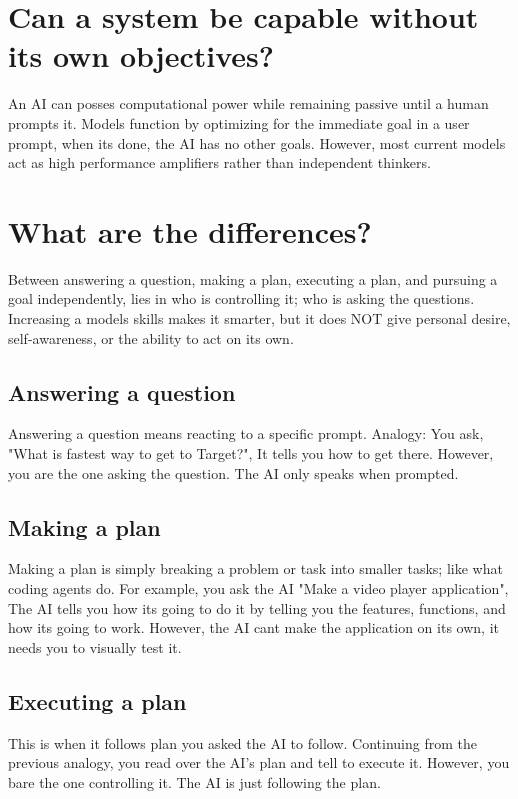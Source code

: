 \documentclass{report}
\begin{document}
	\section{Can a system be capable without its own objectives?}
	An AI can posses computational power while remaining passive until a human prompts it. Models function by optimizing for the immediate goal in a user prompt, when its done, the AI has no other goals. However, most current models act as high performance amplifiers rather than independent thinkers.
	
	\section{What are the differences?}
	Between answering a question, making a plan, executing a plan, and pursuing a goal independently, lies in who is controlling it; who is asking the questions. Increasing a models skills makes it smarter, but it does NOT give personal desire, self-awareness, or the ability to act on its own.
	
	\subsection{Answering a question}
	Answering a question means reacting to a specific prompt. Analogy: You ask, "What is fastest way to get to Target?", It tells you how to get there. However, you are the one asking the question. The AI only speaks when prompted.
	
	\subsection{Making a plan}
	Making a plan is simply breaking a problem or task into smaller tasks; like what coding agents do. For example, you ask the AI "Make a video player application", The AI tells you how its going to do it by telling you the features, functions, and how its going to work. However, the AI cant make the application on its own, it needs you to visually test it.
	
	\subsection{Executing a plan}
	This is when it follows plan you asked the AI to follow. Continuing from the previous analogy, you read over the AI's plan and tell to execute it. However, you bare the one controlling it. The AI is just following the plan. 
	
\end{document}
